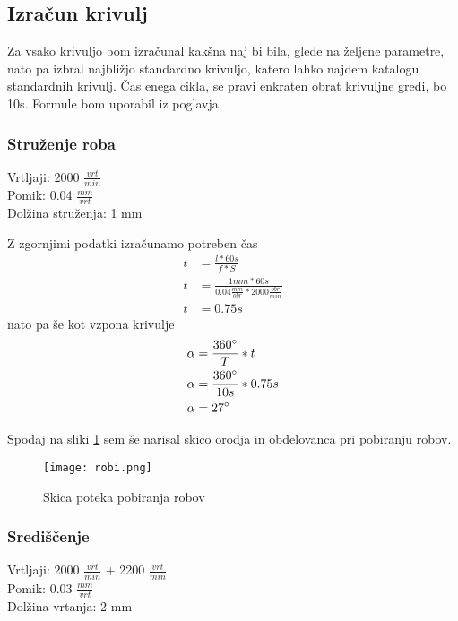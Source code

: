 \subsection{Izračun krivulj}
Za vsako krivuljo bom izračunal kakšna naj bi bila, glede na
željene parametre, nato pa izbral najbližjo standardno krivuljo,
katero lahko najdem katalogu standardnih krivulj.
Čas enega cikla, se pravi enkraten obrat krivuljne gredi, bo 10s.
Formule bom uporabil iz poglavja 

\subsubsection{Struženje roba}
Vrtljaji: 2000 \( \frac{vrt}{min} \) \\
Pomik: 0.04 \( \frac{mm}{vrt} \) \\
Dolžina struženja: 1 mm

Z zgornjimi podatki izračunamo potreben čas
\begin{equation}
	\begin{split}
		t &= \frac{l*60s}{f*S} \\
		t &= \frac{1mm*60s}{0.04\frac{mm}{obr}*2000\frac{obr}{min}} \\
		t &= 0.75 s
	\end{split}
\end{equation}
nato pa še kot vzpona krivulje
\begin{equation}
	\begin{split}
		\alpha &= \frac{360\degree}{T} * t \\
		\alpha &= \frac{360\degree}{10s} * 0.75 s\\
		\alpha &= 27\degree
	\end{split}
\end{equation}

Spodaj na sliki \ref{shema_robov} sem še narisal skico orodja
in obdelovanca pri pobiranju robov.
\begin{figure}[H]
	\begin{center}
		\texttt{[image: robi.png]}
		\caption{Skica poteka pobiranja robov
			\cite{lasten}}
		\label{shema_robov}
	\end{center}
\end{figure}

\subsubsection{Središčenje}
Vrtljaji: 2000 \( \frac{vrt}{min} \) + 2200 \( \frac{vrt}{min} \)\\
Pomik: 0.03 \( \frac{mm}{vrt} \) \\
Dolžina vrtanja: 2 mm

